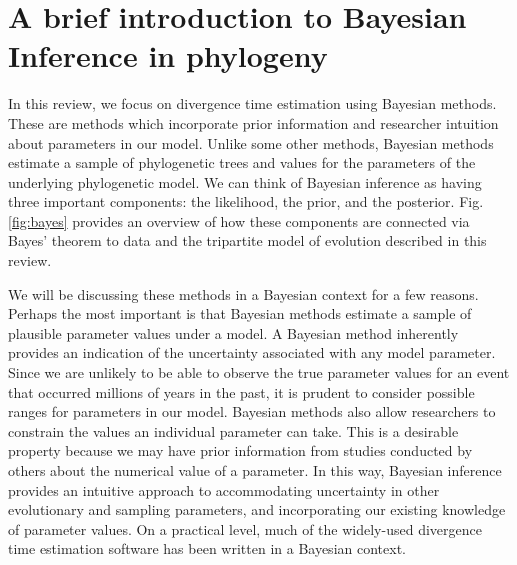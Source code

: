 \documentclass[11pt]{article}
\newcommand{\rw}[1]{{\textcolor{red}{[RW: #1]}}} %
\newcommand{\aw}[1]{{\textcolor{armygreen}{[AW: #1]}}} %
\begin{document}
\section{A brief introduction to Bayesian Inference in phylogeny}

In this review, we focus on divergence time estimation using Bayesian methods. 
These are methods which incorporate prior information and researcher intuition about parameters in our model.
Unlike some other methods, Bayesian methods estimate a sample of phylogenetic trees and values for the parameters of the underlying phylogenetic model.
We can think of Bayesian inference as having three important components: the likelihood, the prior, and the posterior.
Fig. \ref{fig:bayes} provides an overview of how these components are connected via Bayes' theorem to data and the tripartite model of evolution described in this review. %

We will be discussing these methods in a Bayesian context for a few reasons.
Perhaps the most important is that Bayesian methods estimate a sample of plausible parameter values under a model. 
A Bayesian method inherently provides an indication of the uncertainty associated with any model parameter.
Since we are unlikely to be able to observe the true parameter values for an event that occurred millions of years in the past, it is prudent to consider possible ranges for parameters in our model.
Bayesian methods also allow researchers to constrain the values an individual parameter can take. 
This is a desirable property because we may have prior information from studies conducted by others about the numerical value of a parameter.
In this way, Bayesian inference provides an intuitive approach to accommodating uncertainty in other evolutionary and sampling parameters, and incorporating our existing knowledge of parameter values.
On a practical level, much of the widely-used divergence time estimation software has been written in a Bayesian context.

\end{document}
